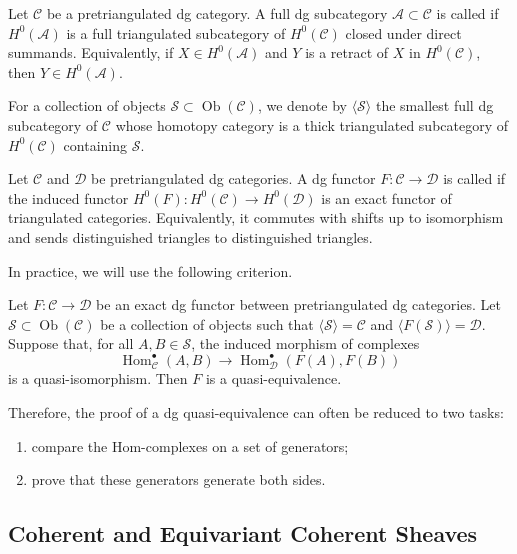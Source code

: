 {Let \(\mathcal C\) be a pretriangulated dg category.  A full dg
subcategory \(\mathcal A\subset\mathcal C\) is called  if
\(H^0(\mathcal A)\) is a full triangulated subcategory of
\(H^0(\mathcal C)\) closed under direct summands.  Equivalently, if
\(X\in H^0(\mathcal A)\) and \(Y\) is a retract of \(X\) in
\(H^0(\mathcal C)\), then \(Y\in H^0(\mathcal A)\).

For a collection of objects \(\mathcal S\subset\operatorname{Ob}(\mathcal C)\),
we denote by \(\langle\mathcal S\rangle\) the smallest full dg subcategory
of \(\mathcal C\) whose homotopy category is a thick triangulated
subcategory of \(H^0(\mathcal C)\) containing \(\mathcal S\).

Let \(\mathcal C\) and \(\mathcal D\) be pretriangulated dg categories.
A dg functor \(F:\mathcal C\to\mathcal D\) is called  if
the induced functor \(H^0(F):H^0(\mathcal C)\to H^0(\mathcal D)\) is an
exact functor of triangulated categories.  Equivalently, it commutes
with shifts up to isomorphism and sends distinguished triangles to
distinguished triangles.

In practice, we will use the following criterion.

\begin{theorem}\label{thm:generator-criterion}
Let \(F:\mathcal C\to\mathcal D\) be an exact dg functor between
pretriangulated dg categories.  Let
\(\mathcal S\subset\operatorname{Ob}(\mathcal C)\) be a collection of
objects such that \(\langle\mathcal S\rangle=\mathcal C\) and
\(\langle F(\mathcal S)\rangle=\mathcal D\).  Suppose that, for all
\(A,B\in\mathcal S\), the induced morphism of complexes
\[
\operatorname{Hom}_{\mathcal C}^{\bullet}(A,B)
\longrightarrow
\operatorname{Hom}_{\mathcal D}^{\bullet}(F(A),F(B))
\]
is a quasi-isomorphism.  Then \(F\) is a quasi-equivalence.
\end{theorem}

Therefore, the proof of a dg quasi-equivalence can often be reduced to
two tasks:
\begin{enumerate}
    \item compare the Hom-complexes on a set of generators;
    \item prove that these generators generate both sides.
\end{enumerate}





\subsection{Coherent and Equivariant Coherent Sheaves}

}
